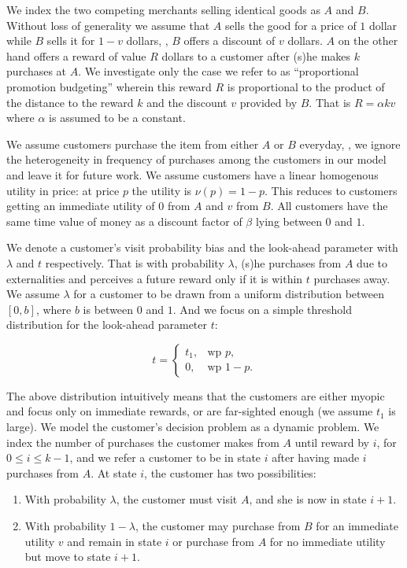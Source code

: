 We index the two competing merchants selling identical goods as $A$ and $B$.
Without loss of generality we assume that $A$ sells the good for a price of $1$ dollar while $B$ sells it for $1-v$ dollars, \ie, $B$ offers a discount of $v$ dollars. 
$A$ on the other hand offers a reward of value $R$ dollars to a customer after (s)he makes $k$ purchases at $A$. 
We investigate only the case we refer to as ``proportional promotion budgeting'' wherein this reward $R$ is proportional to the product of the distance to the reward $k$ and the discount $v$ provided by $B$.
That is $R = \alpha k v$ where $\alpha$ is assumed to be a constant.

We assume customers purchase the item from either $A$ or $B$ everyday, \ie, we ignore the heterogeneity in frequency of purchases among the customers in our model and leave it for future work.
We assume customers have a linear homogenous utility in price: at price $p$ the utility is $\nu(p) = 1-p$. 
This reduces to customers getting an immediate utility of $0$ from $A$ and $v$ from $B$.
All customers have the same time value of money as a discount factor of $\beta$ lying between $0$ and $1$.

We denote a customer's visit probability bias and the look-ahead parameter with $\lambda$ and $t$ respectively. 
That is with probability $\lambda$, (s)he purchases from $A$ due to externalities and perceives a future reward only if it is within $t$ purchases away. 
We assume $\lambda$ for a customer to be drawn from a uniform distribution between $[0,b]$, where $b$ is between $0$ and $1$.
And we focus on a simple threshold distribution for the look-ahead parameter $t$: 

\begin{equation*}
  t=\begin{cases}
    t_1, & \text{wp } p,\\
    0, & \text{wp } 1-p.
  \end{cases}
\end{equation*}

The above distribution intuitively means that the customers are either myopic and focus only on immediate rewards, or are far-sighted enough (we assume $t_1$ is large).
We model the customer's decision problem as a dynamic problem. We index the number of purchases the customer makes from $A$ until reward by $i$, for $0 \leq i \leq k-1$, and we refer a customer to be in state $i$ after having made $i$ purchases from $A$. At state $i$, the customer has two possibilities:
\begin{enumerate}
\item
With probability $\lambda$, the customer must visit $A$, and she is now in state $i+1$.
\item
With probability $1-\lambda$, the customer may purchase from $B$ for an immediate utility $v$ and remain in state $i$ or purchase from $A$ for no immediate utility but move to state $i+1$.
\end{enumerate}

